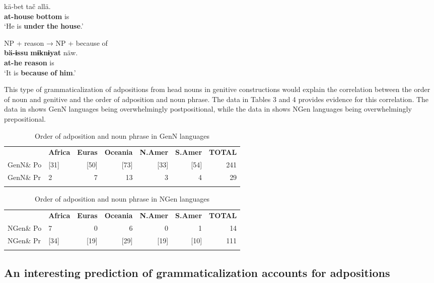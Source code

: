\documentclass[output=paper]{langsci/langscibook}
\begin{document}
\gll   kä-bet    tač    allä.\\
       \textbf{at-house}  \textbf{bottom}  is\\
\glt   ‘He is \textbf{under} \textbf{the} \textbf{house}.’

\ex  NP + reason → NP + because of\\

\gll   \textbf{bä-ɨssu}  \textbf{mɨknɨyat}  näw.\\
       \textbf{at-he}    \textbf{reason}  is\\
\glt   ‘It is \textbf{because} \textbf{of} \textbf{him}.’
\z
\z

This type of grammaticalization of adpositions from head nouns in genitive constructions would explain the correlation between the order of noun and genitive and the order of adposition and noun phrase. The data in Tables 3 and 4 provides evidence for this correlation. The data in  shows GenN languages being overwhelmingly postpositional, while the data in  shows NGen languages being overwhelmingly prepositional.

\begin{table}
\begin{tabularx}{\textwidth}{Xlrrrrr}
\lsptoprule
& \bfseries Africa & \bfseries Euras & \bfseries Oceania & \bfseries N.Amer & \bfseries S.Amer & \bfseries TOTAL\\
GenN\& Po & [31] & [50] & [73] & [33] & [54] & 241\\
GenN\& Pr & 2 & 7 & 13 & 3 & 4 & 29\\
\lspbottomrule
\end{tabularx}
\caption{\label{tab:dryer:3}Order of adposition and noun phrase in GenN languages}
\end{table}


\begin{table}
\begin{tabularx}{\textwidth}{Xlrrrrr}
\lsptoprule
& \bfseries Africa & \bfseries Euras & \bfseries Oceania & \bfseries N.Amer & \bfseries S.Amer & \bfseries TOTAL\\
NGen\& Po & 7 & 0 & 6 & 0 & 1 & 14\\
NGen\& Pr & [34] & [19] & [29] & [19] & [10] & 111\\
\lspbottomrule
\end{tabularx}
\caption{\label{tab:dryer:4}Order of adposition and noun phrase in NGen languages}
\end{table}


\subsection{An interesting prediction of grammaticalization accounts for adpositions}
\end{document}
